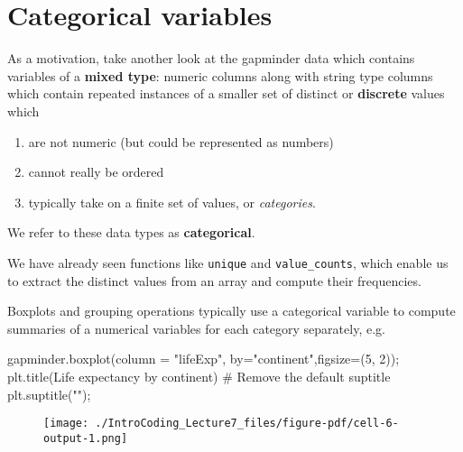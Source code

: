 \documentclass[
  letterpaper,
  DIV=11,
  numbers=noendperiod]{scrreprt}
\newenvironment{Shaded}{\begin{snugshade}}{\end{snugshade}}
\newcommand{\CommentTok}[1]{\textcolor[rgb]{0.37,0.37,0.37}{#1}}
\newcommand{\DecValTok}[1]{\textcolor[rgb]{0.68,0.00,0.00}{#1}}
\newcommand{\NormalTok}[1]{\textcolor[rgb]{0.00,0.23,0.31}{#1}}
\newcommand{\OperatorTok}[1]{\textcolor[rgb]{0.37,0.37,0.37}{#1}}
\newcommand{\StringTok}[1]{\textcolor[rgb]{0.13,0.47,0.30}{#1}}
\providecommand{\tightlist}{%
  \setlength{\itemsep}{0pt}\setlength{\parskip}{0pt}}\usepackage{longtable,booktabs,array}
\begin{document}
\hypertarget{categorical-variables}{%
\section{Categorical variables}\label{categorical-variables}}

As a motivation, take another look at the gapminder data which contains
variables of a \textbf{mixed type}: numeric columns along with string
type columns which contain repeated instances of a smaller set of
distinct or \textbf{discrete} values which

\begin{enumerate}
\def\labelenumi{\arabic{enumi}.}
\tightlist
\item
  are not numeric (but could be represented as numbers)
\item
  cannot really be ordered
\item
  typically take on a finite set of values, or \emph{categories}.
\end{enumerate}

We refer to these data types as \textbf{categorical}.

We have already seen functions like \texttt{unique} and
\texttt{value\_counts}, which enable us to extract the distinct values
from an array and compute their frequencies.

Boxplots and grouping operations typically use a categorical variable to
compute summaries of a numerical variables for each category separately,
e.g.

\begin{Shaded}
\begin{Highlighting}[]
\NormalTok{gapminder.boxplot(column }\OperatorTok{=} \StringTok{"lifeExp"}\NormalTok{, by}\OperatorTok{=}\StringTok{"continent"}\NormalTok{,figsize}\OperatorTok{=}\NormalTok{(}\DecValTok{5}\NormalTok{, }\DecValTok{2}\NormalTok{))}\OperatorTok{;}
\NormalTok{plt.title(}\StringTok{\textquotesingle{}Life expectancy by continent\textquotesingle{}}\NormalTok{)}
\CommentTok{\# Remove the default suptitle}
\NormalTok{plt.suptitle(}\StringTok{""}\NormalTok{)}\OperatorTok{;}
\end{Highlighting}
\end{Shaded}

\begin{figure}[H]

{\centering \texttt{[image: ./IntroCoding\_Lecture7\_files/figure-pdf/cell-6-output-1.png]}

}

\end{figure}
\end{document}
